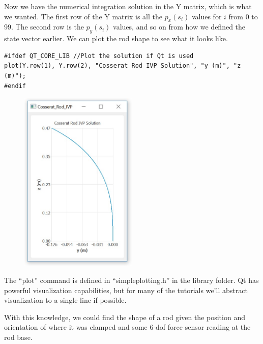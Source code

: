 \documentclass[12pt]{article}
\begin{document}
Now we have the numerical integration solution in the Y matrix, which is what we wanted. The first row of the Y matrix is all the $p_x(s_i)$ values for $i$ from 0 to 99. The second row is the $p_y(s_i)$ values, and so on from how we defined the state vector earlier. We can plot the rod shape to see what it looks like.
\begin{lstlisting}
#ifdef QT_CORE_LIB //Plot the solution if Qt is used
plot(Y.row(1), Y.row(2), "Cosserat Rod IVP Solution", "y (m)", "z (m)");
#endif
\end{lstlisting}
\begin{figure}[h]
	\centering
		\includegraphics[width=0.5\textwidth]{fig/SolutionPlot.jpg}
	\label{fig:SolutionPlot}
\end{figure}
The ``plot'' command is defined in ``simpleplotting.h'' in the library folder. Qt has powerful visualization capabilities, but for many of the tutorials we'll abstract visualization to a single line if possible.

With this knowledge, we could find the shape of a rod given the position and orientation of where it was clamped and some 6-dof force sensor reading at the rod base.
\end{document}
